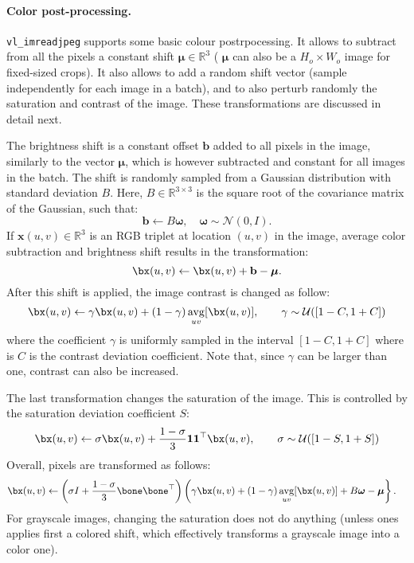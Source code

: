 \paragraph{Color post-processing.} \verb!vl_imreadjpeg! supports some basic colour postrpocessing. It allows to subtract from all the pixels a constant shift $\boldsymbol{\mu} \in \mathbb{R}^3$ ( $\boldsymbol{\mu}$ can also be a $H_o \times W_o$ image for fixed-sized crops). It also allows to add a random shift vector (sample independently for each image in a batch), and to also perturb randomly the saturation and contrast of the image. These transformations are discussed in detail next.

The brightness shift is a constant offset $\mathbf{b}$ added to all pixels in the image, similarly to the vector $\boldsymbol{\mu}$, which is however subtracted and constant for all images in the batch. The shift is randomly sampled from a Gaussian distribution with standard deviation $B$. Here, $B\in\mathbb{R}^{3\times 3}$ is the square root of the covariance matrix of the Gaussian, such that:
\[
\mathbf{b} \leftarrow B \boldsymbol{\omega},
\quad
\boldsymbol{\omega} \sim \mathcal{N}(0,I).
\]
If $\mathbf{x}(u,v)\in\mathbb{R}^3$ is an RGB triplet at location $(u,v)$ in the image, average color subtraction and brightness shift results in the transformation:
\[
  \bx(u,v) \leftarrow \bx(u,v) + \mathbf{b} - \boldsymbol{\mu}.
\]
After this shift is applied, the image contrast is changed as follow:
\[
\bx(u,v) \leftarrow \gamma \bx(u,v) + (1-\gamma) \operatornamewithlimits{avg}_{uv}[\bx(u,v)],
\qquad \gamma \sim \mathcal{U}([1-C,1+C])
\]
where the coefficient $\gamma$ is uniformly sampled in the interval $[1-C,1+C]$ where is $C$ is the contrast deviation coefficient. Note that, since $\gamma$ can be larger than one, contrast can also be increased.

The last transformation changes the saturation of the image. This is controlled by the saturation deviation coefficient $S$:
\[
\bx(u,v) \leftarrow \sigma \bx(u,v) + \frac{1-\sigma}{3} \mathbf{1}\mathbf{1}^\top \bx(u,v),
\qquad \sigma \sim \mathcal{U}([1-S,1+S])
\]
Overall, pixels are transformed as follows:
\begin{align*}
\bx(u,v) 
&
\leftarrow 
\left(\sigma I + \frac{1 - \sigma}{3} \bone\bone^\top\right)
\left(
\gamma \bx(u,v)+
(1 - \gamma) \operatornamewithlimits{avg}_{uv}[\bx(u,v)]
+ B \boldsymbol{\omega} 
- \boldsymbol{\mu}
\right\}.
\end{align*}
For grayscale images, changing the saturation does not do anything (unless ones applies first a colored shift, which effectively transforms a grayscale image into a color one).




